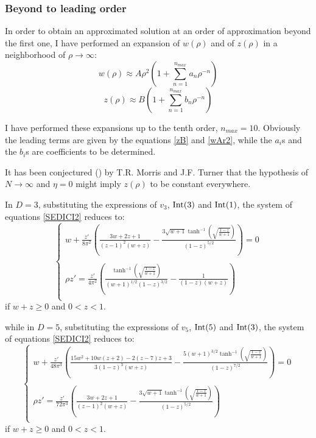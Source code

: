 \subsubsection{Beyond to leading order}
In order to obtain an approximated solution at an order of approximation beyond the first one, I have 
performed an expansion of $w(\rho)$ and of $z(\rho)$ in a neighborhood of $\rho \to \infty$:
\begin{equation}
 w(\rho) \approx A \rho ^2 \left(1+ \sum _{n=1}^{n_{max}} a_n \rho ^{-n}\right)
\end{equation}
\begin{equation}\label{zetaserie}
z(\rho) \approx B \left(1+ \sum _{n=1}^{n_{max}} b_n \rho ^{-n}\right)
\end{equation}

I have performed these expansions up to the tenth order, $n_{max} = 10$.
Obviously the leading terms are given by the equations \eqref{zB} and \eqref{wAr2}, while the $a_i$s and the $b_i$s are coefficients to be determined. 

It has been conjectured (\cite{morristurner}) by T.R. Morris and J.F. Turner that the hypothesis of $N \to \infty$ and $\eta = 0$ might imply $z(\rho)$ to be constant everywhere.

In $D=3$, substituting the expressions of $v_3$, $\operatorname{Int}(3)$ and $\operatorname{Int}(1)$, the system of equations \eqref{SEDICI2} reduces to:
\begin{displaymath}
\left\{
\begin{array}{l}
w  + \frac{z'}{8\pi^2} \left(\frac{3 w+2 z+1}{(z-1)^2 (w+z)}-\frac{3 \sqrt{w+1} \tanh ^{-1}\left(\sqrt{\frac{1-z}{w+1}}\right)}{(1-z)^{5/2}}\right) = 0\\ \\
\rho z' = \frac{z'}{4\pi^2}\left(\frac{\tanh ^{-1}\left(\sqrt{\frac{1-z}{w+1}}\right)}{(w+1)^{1/2} (1-z)^{3/2}}-\frac{1}{(1-z) (w+z)}\right)\\
\end{array}
\right.
\end{displaymath}
if $ w + z \geq 0$ and $0<z<1$.

while in $D=5$, substituting the expressions of $v_5$, $\operatorname{Int}(5)$ and $\operatorname{Int}(3)$, the system of equations \eqref{SEDICI2} reduces to:
\begin{equation}
\left\{
\begin{array}{l}
 w  + \frac{z'}{48\pi^3} \left(\frac{15 w^2+10 w (z+2)-2 (z-7) z+3}{3 (1-z)^3 (w+z)}-\frac{5 (w+1)^{3/2} \tanh ^{-1}\left(\sqrt{\frac{1-z}{w+1}}\right)}{(1-z)^{7/2}}\right) = 0\\ \\
\rho z' = \frac{z'}{72 \pi^3}\left( \frac{3 w+2 z+1}{(z-1)^2 (w+z)}-\frac{3 \sqrt{w+1} \tanh ^{-1}\left(\sqrt{\frac{1-z}{w+1}}\right)}{(1-z)^{5/2}} \right)\\
\end{array} 
\right.
\end{equation}
if $ w + z \geq 0$ and $0<z<1$.


